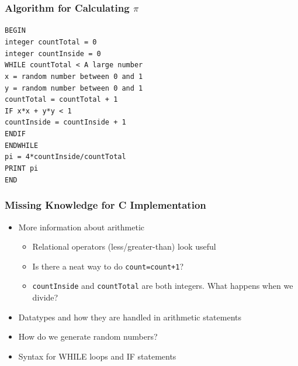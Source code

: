 \documentclass[14pt]{beamer}
\begin{document}
\begin{frame}
\frametitle{Algorithm for Calculating $\pi$}
{\footnotesize
\texttt{BEGIN\\
\quad integer countTotal = 0\\
\quad integer countInside = 0\\
\quad WHILE countTotal < A large number\\
\quad \quad x = random number between 0 and 1\\
\quad \quad y = random number between 0 and 1\\
\quad \quad countTotal = countTotal + 1\\
\quad \quad IF x*x + y*y < 1\\
\quad \quad \quad countInside = countInside + 1\\
\quad \quad ENDIF\\
\quad ENDWHILE\\
\quad pi = 4*countInside/countTotal\\
\quad PRINT pi\\
END\\
}
}
\end{frame}

\begin{frame}
\frametitle{Missing Knowledge for C Implementation}
\begin{itemize}
\item More information about arithmetic
\begin{itemize}
	\item Relational operators (less/greater-than) look useful
	\item Is there a neat way to do \texttt{count=count+1}?
	\item \texttt{countInside} and \texttt{countTotal} are both integers. What happens when we divide?
\end{itemize}
\item Datatypes and how they are handled in arithmetic statements
\item How do we generate random numbers?
\item Syntax for WHILE loops and IF statements
\end{itemize}
\end{frame}
\end{document}
